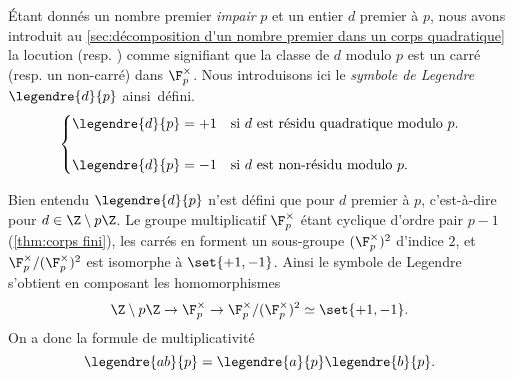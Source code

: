 \documentclass[11pt, %
  title in boldface,
  theorem in new line,
  theorem numbering = section,
  number theorems separately,
  simple name,
]{beaulivre}
\begin{document}
    Étant donnés un nombre premier \emph{impair} \( p \) et un entier \( d \) premier à \( p \), nous avons introduit au \cref{sec:décomposition d'un nombre premier dans un corps quadratique} la locution  (resp. ) comme signifiant que la classe de \( d \) modulo \( p \) est un carré (resp. un non-carré) dans \( \F_p^\times \). Nous introduisons ici le \emph{symbole de Legendre} \( \legendre{d}{p} \) ainsi~défini.
    \vspace{-.3\baselineskip}
    \begin{equation}
        \begin{cases}
            \displaystyle\legendre{d}{p} = +1 & \text{si \( d \) est résidu quadratique modulo \( p \)}.\\[1.5em]
            \displaystyle\legendre{d}{p} = -1 & \text{si \( d \) est non-résidu modulo \( p \)}.
        \end{cases}
    \end{equation}

    Bien entendu \( \legendre{d}{p} \) n'est défini que pour \( d \) premier à \( p \), c'est-à-dire pour \( d \in \Z \setminus p\Z \). Le groupe multiplicatif \( \F_p^\times \) étant cyclique d'ordre pair \( p-1 \) (\cref{thm:corps fini}), les carrés en forment un sous-groupe \( (\F_p^\times)^2 \) d'indice \( 2 \), et \( \F_p^\times/(\F_p^\times)^2 \) est isomorphe à \( \set{+1,-1} \). Ainsi le symbole de Legendre s'obtient en composant les homomorphismes
    \[
        \Z \setminus p\Z \to \F_p^\times \to \F_p^\times/(\F_p^\times)^2 \simeq \set{+1,-1}.
    \]
    On a donc la formule de multiplicativité
    \begin{equation}\label{eq:multiplicativité du symbole de Legendre}
        \legendre{ab}{p} = \legendre{a}{p} \legendre{b}{p}.
    \end{equation}
\end{document}
